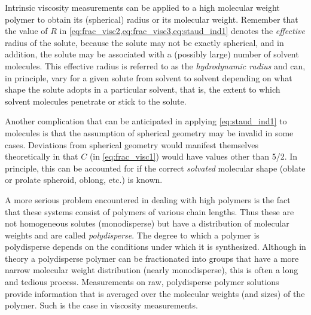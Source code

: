 \documentclass[nobib,nofonts,nols,nohyper]{tufte-handout}
\begin{document}
Intrinsic viscosity measurements can be applied to a high molecular weight polymer to obtain its (spherical) radius or its molecular weight. 
Remember that the value of \( R \) in \cref{eq:frac_visc2,eq:frac_visc3,eq:staud_ind1} denotes the \emph{effective} radius of the solute, because the solute may not be exactly spherical, and in addition, the solute may be associated with a (possibly large) number of solvent molecules. 
This effective radius is referred to as the \emph{hydrodynamic radius} and can, in principle, vary for a given solute from solvent to solvent depending on what shape the solute adopts in a particular solvent, that is, the extent to which solvent molecules penetrate or stick to the solute.

Another complication that can be anticipated in applying \cref{eq:staud_ind1} to molecules is that the assumption of spherical geometry may be invalid in some cases. 
Deviations from spherical geometry would manifest themselves theoretically in that \( C \) (in \cref{eq:frac_visc1}) would have values other than \num{5/2}. 
In principle, this can be accounted for if the correct \emph{solvated} molecular shape (oblate or prolate spheroid, oblong, etc.) is known.

A more serious problem encountered in dealing with high polymers is the fact that these systems consist of polymers of various chain lengths. 
Thus these are not homogeneous solutes (monodisperse) but have a distribution of molecular weights and are called \emph{polydisperse}. 
The degree to which a polymer is polydisperse depends on the conditions under which it is synthesized. 
Although in theory a polydisperse polymer can be fractionated into groups that have a more narrow molecular weight distribution (nearly monodisperse), this is often a long and tedious process. 
Measurements on raw, polydisperse polymer solutions provide information that is averaged over the molecular weights (and sizes) of the polymer. 
Such is the case in viscosity measurements.
\end{document}
